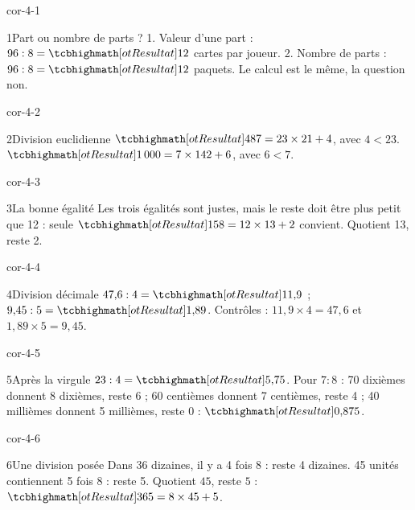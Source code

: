 \clearpage\pagestyle{otMain}\setlength{\otBlocEspacement}{2.5mm}\fontsize{11}{15}\selectfont{}
\begin{blocLivre}{cor-4-1}\begin{corrige}{1}{Part ou nombre de parts ?}
1. Valeur d’une part : $96:8=\res{12}$ cartes par joueur. 2. Nombre de parts : $96:8=\res{12}$ paquets. Le calcul est le même, la question non.
\end{corrige}\end{blocLivre}
\begin{blocLivre}{cor-4-2}\begin{corrige}{2}{Division euclidienne}
$\res{487=23\times21+4}$, avec $4<23$. $\res{1\,000=7\times142+6}$, avec $6<7$.
\end{corrige}\end{blocLivre}
\begin{blocLivre}{cor-4-3}\begin{corrige}{3}{La bonne égalité}
Les trois égalités sont justes, mais le reste doit être plus petit que 12 : seule $\res{158=12\times13+2}$ convient. Quotient 13, reste 2.
\end{corrige}\end{blocLivre}
\begin{blocLivre}{cor-4-4}\begin{corrige}{4}{Division décimale}
$47{,}6:4=\res{11{,}9}$ ; $9{,}45:5=\res{1{,}89}$. Contrôles : $11{,}9\times4=47{,}6$ et $1{,}89\times5=9{,}45$.
\end{corrige}\end{blocLivre}
\begin{blocLivre}{cor-4-5}\begin{corrige}{5}{Après la virgule}
$23:4=\res{5{,}75}$. Pour $7:8$ : 70 dixièmes donnent 8 dixièmes, reste 6 ; 60 centièmes donnent 7 centièmes, reste 4 ; 40 millièmes donnent 5 millièmes, reste 0 : $\res{0{,}875}$.
\end{corrige}\end{blocLivre}
\begin{blocLivre}{cor-4-6}\begin{corrige}{6}{Une division posée}
Dans 36 dizaines, il y a 4 fois 8 : reste 4 dizaines. 45 unités contiennent 5 fois 8 : reste 5. Quotient $45$, reste $5$ : $\res{365=8\times45+5}$.
\label{fig-cor-4-6}
\end{corrige}\end{blocLivre}

